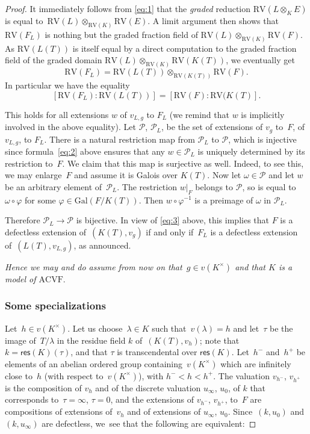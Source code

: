 \documentclass[JEP,XML,SOM,Unicode,ThmDefs,NoEqCountersInSection,published]{cedram}
\newcommand{\acvf}{\mathrm{ACVF}}
\let\phi\varphi
\theoremstyle{plain}
\theoremstyle{definition}
\begin{document}
\begin{proof}
It immediately follows
from \eqref{eq:1} that the \emph{graded}
reduction $\mathrm{RV}(L\otimes_K E)$ is
equal to~$\mathrm{RV}(L)\otimes_{\mathrm{RV}(K)}
\mathrm{RV}(E)$.
A limit argument then
shows that
$\mathrm{RV}(F_L)$ is
nothing but the graded fraction field
of
$\mathrm{RV}(L)\otimes_{\mathrm{RV}(K)}\mathrm{RV}(F)$. As
$\mathrm{RV}(L(T))$ is
itself equal by a direct computation to the graded fraction field
of
the graded domain $\mathrm{RV}(L)\otimes_{
\mathrm{RV}(K)}\mathrm{RV}(K(T))$,
we eventually get
\[\mathrm{RV}(F_L)=\mathrm{RV}(L(T))\otimes_{
\mathrm{RV}(K(T))}\mathrm{RV}(F).\]
In particular we have the equality
\begin{equation}\label{eq:3}
[\mathrm{RV}
(F_L):\mathrm{RV}(L(T))]=[\mathrm{RV}(F):\mathrm{RV}(K(T)].
\end{equation}

This holds for all extensions $w$ of $v_{L,g}$ to $F_L$ (we remind that
$w$ is implicitly involved in the above equality). Let $\mathcal P$, \resp $\mathcal P_L$, be the set of extensions
of $v_g$ to~$F$, \resp of $v_{L,g}$, to $F_L$. There is a natural restriction map
from $\mathcal P_L$ to $\mathcal P$, which is injective since
formula~\eqref{eq:2} above ensures that any $w\in \mathcal P_L$
is uniquely determined by its restriction to~$F$.
We claim that this map is surjective as well. Indeed,
to see this, we may enlarge~$F$ and assume it is Galois over $K(T)$.
Now let $\omega\in \mathcal P$ and let $w$ be an arbitrary element of~$\mathcal P_L$.
The restriction $w|_F$ belongs to $\mathcal P$, so is equal to $\omega\circ \phi$
for some $\phi\in \mathrm{Gal}(F/K(T))$. Then $w\circ \phi^{-1}$ is a preimage
of $\omega$ in $\mathcal P_L$.

Therefore $\mathcal P_L\to \mathcal P$ is bijective. In view of \eqref{eq:3} above, this implies that
$F$ is a defectless
extension of~$(K(T), v_g)$ if and only if~$F_L$ is a defectless extension of~$(L(T),v_{L,g})$,
as announced.

\textit{Hence we may and do
assume from
now on that~$g\in v(K^\times)$ and that $K$ is a model of $\acvf$}.

\subsubsection{Some specializations}
\label{subsubsection-specialization}Let~$h\!\in\! v(K^\times)$. Let us choose~$\lambda\!\in\! K$ such that~\hbox{$v(\lambda)=h$} and let~$\tau$ be the image of~$T/\lambda$ in the residue field $k$ of~$(K(T),v_h)$; note that~$k=\mathsf{res}(K)(\tau)$, and that
$\tau$ is transcendental over $\mathsf{res}(K)$.
Let~$h^- $ and~$h^+$ be elements of an abelian ordered group containing~$v(K^\times)$ which are infinitely close to~$h$ (with respect to~$v(K^\times)$), with
$h^-<h<h^+$. The valuation $v_{h^-}$, \resp
$v_{h^+}$ is the composition of $v_h$ and of the discrete valuation $u_\infty$, \resp $u_0$, of $k$ that corresponds to~$\tau=\infty$, \resp $\tau=0$, and the extensions of $v_{h^-}$, \resp $v_{h^+}$, to~$F$ are compositions of extensions of~$v_h$ and of extensions of
$u_\infty$, \resp $u_0$. Since~$(k, u_0)$ and $(k, u_\infty)$ are defectless,
we~see that the following are equivalent:


\end{proof}
\end{document}
